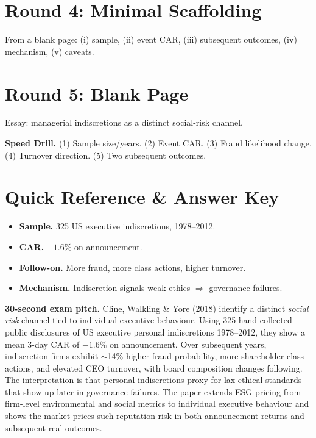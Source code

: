 \documentclass[11pt]{article}
\begin{document}
\section*{Round 4: Minimal Scaffolding}
From a blank page: (i) sample, (ii) event CAR, (iii) subsequent outcomes, (iv) mechanism, (v) caveats.

\section*{Round 5: Blank Page}
Essay: managerial indiscretions as a distinct social-risk channel.

\vspace{6pt}
\begin{drillbox}
\textbf{Speed Drill.} (1) Sample size/years. (2) Event CAR. (3) Fraud likelihood change. (4) Turnover direction. (5) Two subsequent outcomes.
\end{drillbox}

\section*{Quick Reference \& Answer Key}
\begin{answerbox}
\begin{itemize}
\item \textbf{Sample.} 325 US executive indiscretions, 1978--2012.
\item \textbf{CAR.} $-1.6\%$ on announcement.
\item \textbf{Follow-on.} More fraud, more class actions, higher turnover.
\item \textbf{Mechanism.} Indiscretion signals weak ethics $\Rightarrow$ governance failures.
\end{itemize}
\end{answerbox}

\begin{keybox}
\textbf{30-second exam pitch.} Cline, Walkling \& Yore (2018) identify a distinct \emph{social risk} channel tied to individual executive behaviour. Using 325 hand-collected public disclosures of US executive personal indiscretions 1978--2012, they show a mean 3-day CAR of $-1.6\%$ on announcement. Over subsequent years, indiscretion firms exhibit $\sim$14\% higher fraud probability, more shareholder class actions, and elevated CEO turnover, with board composition changes following. The interpretation is that personal indiscretions proxy for lax ethical standards that show up later in governance failures. The paper extends ESG pricing from firm-level environmental and social metrics to individual executive behaviour and shows the market prices such reputation risk in both announcement returns and subsequent real outcomes.
\end{keybox}
\end{document}
